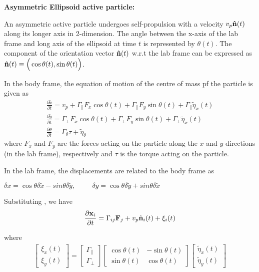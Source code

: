 \documentclass[]{article}
\begin{document}
\textbf{Asymmetric Ellipsoid active particle:}

An asymmetric active particle undergoes self-propulsion with a velocity $v_p \bold {\hat n} (t)$ along its longer axis in 2-dimension. The angle between the x-axis of the lab frame and long axis of the ellipsoid at time $t$ is represented by $\theta(t)$. The component of the
orientation vector $\bold{\hat n}(t)$ w.r.t the lab frame can be
expressed as
$\bold {\hat n}(t)\equiv \Big(\cos \theta(t),\sin \theta(t)\Big)$.

In the body frame, the equation of motion of the centre of mass pf the
particle is given as
\begin{equation} \label{eq1}
\begin{split}
\frac{\partial \tilde x}{\partial t}=v_p+ \Gamma_{\parallel}F_x\cos \theta(t)+ \Gamma_{\parallel}F_y \sin \theta(t) +\Gamma_{\parallel} \tilde\eta_x(t)
\\\frac{\partial \tilde y}{\partial t}=\Gamma_{\perp}F_x\cos \theta(t)+ \Gamma_{\perp}F_y \sin \theta(t) +\Gamma_{\perp} \tilde\eta_x(t)
\\\frac{\partial \theta}{\partial t}  = \Gamma_{\theta} \tau + \tilde\eta_{\theta}
\end{split}
\end{equation}
where $F_x$ and $F_y$ are the forces acting on the particle along
the $x$ and $y$ directions (in the lab frame), respectively and
$\tau$ is the torque acting on the particle.
\newline

In the lab frame, the displacements are related to the body frame as
\newline

$\delta x = \cos θ \delta \tilde x - sin θ\delta\tilde y, \hspace{1cm}
  \delta y = \cos θ\delta \tilde y + sin θ\delta \tilde x $
\newline

Substituting , we have
\begin{equation} \label{eq1}
\frac{\partial \bold x_i}{\partial t} = \Gamma_{ij} \bold F_j + v_p \hat{ \bold n}_i(t) + \bold {\xi}_i(t)
\end{equation}

where
\begin{gather}
\begin{bmatrix}
  \xi_x(t) \\
  \xi_y(t) 
\end{bmatrix}=\begin{bmatrix}
  \Gamma_{\parallel} \\
  \Gamma_{\perp}
\end{bmatrix}
\begin{bmatrix}
  \cos \theta(t) & -\sin \theta(t) \\
  \sin \theta (t) & \cos \theta(t)
\end{bmatrix}
\begin{bmatrix}
  \tilde \eta_x(t) \\
  \tilde\eta_y(t) 
\end{bmatrix}
\end{gather}
\end{document}
